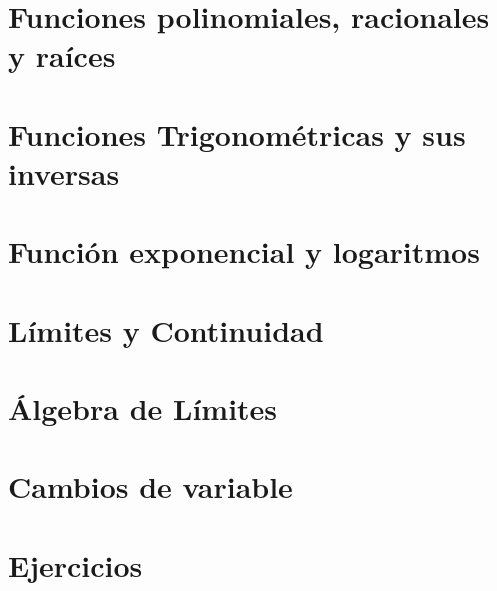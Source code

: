 \documentclass[11pt, twoside]{book}
\begin{document}
\section{Funciones polinomiales, racionales y raíces}
\section{Funciones Trigonométricas y sus inversas}
\section{Función exponencial y logaritmos}
\section{Límites y Continuidad}
\section{Álgebra de Límites}
\section{Cambios de variable}
\section{Ejercicios}




\printbibliography%
\printindex

\begin{titlepage}

    \makebox[0pt][l]{\rule{1.3\textwidth}{0pt}}
    \par
    \pagecolor{ustmidgreen}

    \noindent
\end{titlepage}

\nopagecolor
\end{document}
